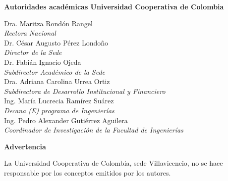 \documentclass[12pt, letterpaper]{article}
\begin{document}
\newpage
\thispagestyle{empty}
\begin{center}
    \vspace*{2cm}
    {\large \bfseries Autoridades académicas Universidad Cooperativa de Colombia\par}
    \vspace{2cm}
\end{center}
\begin{center}
    \large
    Dra. Maritza Rondón Rangel\\
    \textit{Rectora Nacional}\\[1cm]
    Dr. César Augusto Pérez Londoño\\
    \textit{Director de la Sede}\\[1cm]
    Dr. Fabián Ignacio Ojeda\\
    \textit{Subdirector Académico de la Sede}\\[1cm]
    Dra. Adriana Carolina Urrea Ortiz\\
    \textit{Subdirectora de Desarrollo Institucional y Financiero}\\[1cm]
    Ing. María Lucrecia Ramírez Suárez\\
    \textit{Decana (E) programa de Ingenierías}\\[1cm]
    Ing. Pedro Alexander Gutiérrez Aguilera\\
    \textit{Coordinador de Investigación de la Facultad de Ingenierías}\\[1cm]
\end{center}

\newpage
\thispagestyle{empty}
\begin{center}
    \vspace*{3cm}
    {\large \bfseries Advertencia\par}
    \vspace{2cm}
\end{center}
\begin{flushright}
    \large
    La Universidad Cooperativa de Colombia, sede Villavicencio, no se hace\\
    responsable por los conceptos emitidos por los autores.
\end{flushright}
\end{document}
